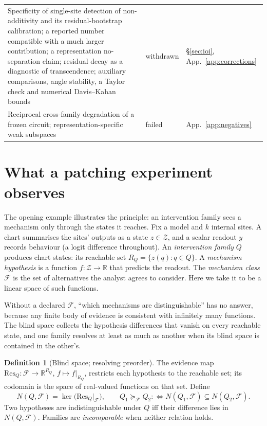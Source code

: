 \documentclass{article}
\theoremstyle{plain}
\theoremstyle{definition}
\newtheorem{definition}[theorem]{Definition}
\begin{document}
\begin{table}[t]
\begin{tabularx}{\textwidth}{@{}>{\raggedright\arraybackslash}X >{\raggedright\arraybackslash}p{} l@{}}
Specificity of single-site detection of non-additivity and its residual-bootstrap calibration; a reported number compatible with a much larger contribution; a representation no-separation claim; residual decay as a diagnostic of transcendence; auxiliary comparisons, angle stability, a Taylor check and numerical Davis--Kahan bounds & withdrawn & \S\ref{sec:ioi}, App.~\ref{app:corrections} \\
Reciprocal cross-family degradation of a frozen circuit; representation-specific weak subspaces & failed & App.~\ref{app:negatives} \\
\bottomrule
\end{tabularx}
\end{table}

\section{What a patching experiment observes}
\label{sec:setup}

The opening example illustrates the principle: an intervention family sees a mechanism only through the states it reaches. Fix a
model and $k$ internal sites. A chart summarises the sites' outputs as a state $z\in\mathcal Z$, and a scalar readout
$y$ records behaviour (a logit difference throughout). An \emph{intervention family} $Q$ produces chart states: its
reachable set $R_Q=\{z(q):q\in Q\}$. A \emph{mechanism hypothesis} is a function $f:\mathcal Z\to\mathbb R$ that
predicts the readout. The \emph{mechanism class} $\mathcal F$ is the set of alternatives the analyst agrees to
consider. Here we take it to be a linear space of such functions.

Without a declared $\mathcal F$, ``which mechanisms are
distinguishable'' has no answer, because any finite body of evidence is consistent with infinitely many functions.
The blind space collects the hypothesis differences that vanish on every reachable state, and one family resolves at
least as much as another when its blind space is contained in the other's.

\begin{definition}[Blind space; resolving preorder]
\label{def:blind}
The evidence map $\mathrm{Res}_Q:\mathcal F\to\mathbb R^{R_Q}$, $f\mapsto f|_{R_Q}$, restricts each
hypothesis to the reachable set; its codomain is the space of real-valued functions on that set. Define
\[
  N(Q,\mathcal F)=\ker\bigl(\mathrm{Res}_Q|_{\mathcal F}\bigr),\qquad
  Q_1\succeq_{\mathcal F}Q_2 :\iff N(Q_1,\mathcal F)\subseteq N(Q_2,\mathcal F).
\]
Two hypotheses are indistinguishable under $Q$ iff their difference lies in $N(Q,\mathcal F)$. Families are
\emph{incomparable} when neither relation holds.
\end{definition}
\end{document}
